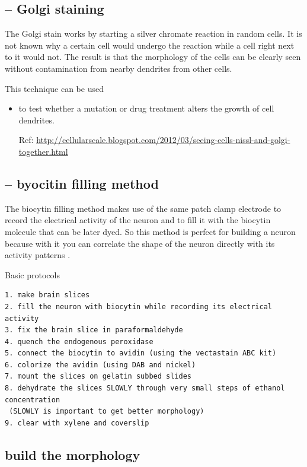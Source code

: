 \subsection{-- Golgi staining}
\label{sec:Golgi-stain}

The Golgi stain works by starting a silver chromate reaction in random cells.
It is not known why a certain cell would undergo the reaction while a cell right
next to it would not. The result is that the morphology of the cells can be
clearly seen without contamination from nearby dendrites from other cells.


This technique can be used   
\begin{itemize}
  \item to test whether a mutation or drug treatment alters the growth of cell
  dendrites.
  
Ref: 
  \url{http://cellularscale.blogspot.com/2012/03/seeing-cells-nissl-and-golgi-together.html}
\end{itemize}


\subsection{-- byocitin filling method}
\label{sec:byocitin-filling}

The biocytin filling method makes use of the same patch clamp electrode to
record the electrical activity of the neuron and to fill it with the biocytin
molecule that can be later dyed.  So this method is perfect for building a
neuron because with it you can correlate the shape of the neuron directly with
its activity patterns \citep{marx2002}.

Basic protocols
\begin{verbatim}
1. make brain slices
2. fill the neuron with biocytin while recording its electrical activity
3. fix the brain slice in paraformaldehyde
4. quench the endogenous peroxidase
5. connect the biocytin to avidin (using the vectastain ABC kit)
6. colorize the avidin (using DAB and nickel)
7. mount the slices on gelatin subbed slides
8. dehydrate the slices SLOWLY through very small steps of ethanol concentration
 (SLOWLY is important to get better morphology)
9. clear with xylene and coverslip
\end{verbatim}


\subsection{build the morphology}

